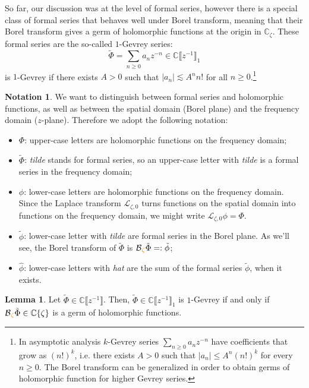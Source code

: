 \documentclass{article}
\theoremstyle{definition}
\newcommand{\C}{\mathbb{C}}
\newcommand{\laplace}{\mathcal{L}}
\newcommand{\borel}{\mathcal{B}}
\newtheorem{lemma}[definition]{Lemma}
\newtheorem*{notation*}{Notation}
\begin{document}
So far, our discussion was at the level of formal series, however there is a special class of formal series that behaves well under Borel transform, meaning that their Borel transform gives a germ of holomorphic functions at the origin in $\C_{\zeta}$. These formal series are the so-called $1$-Gevrey series:
\[\tilde{\Phi}=\sum_{n\geq 0}a_nz^{-n}\in\C \llbracket z^{-1} \rrbracket_1\]
is $1$-Gevrey if there exists $A>0$ such that $|a_n|\lesssim A^n n!$ for all $n\geq 0$.\footnote{In asymptotic analysis $k$-Gevrey series $\sum_{n\geq 0}a_nz^{-n}$ have coefficients that grow as $(n!)^{k}$, i.e. there exists $A>0$ such that $|a_n|\leq A^n (n!)^k$ for every $n\geq 0$. The Borel transform can be generalized in order to obtain germs of holomorphic function for higher Gevrey series. }  

\begin{notation*}
We want to distinguish between formal series and holomorphic functions, as well as between the spatial domain (Borel plane) and the frequency domain ($z$-plane). Therefore we adopt the following notation:
\begin{itemize}
\item $\Phi$: upper-case letters are holomorphic functions on the frequency domain;
\item $\tilde{\Phi}$: \textit{tilde} stands for formal series, so an upper-case letter with \textit{tilde} is a formal series in the frequency domain;
\item $\phi$: lower-case letters are holomorphic functions on the frequency domain. Since the Laplace transform $\laplace_{\zeta, 0}$ turns functions on the spatial domain into functions on the frequency domain, we might write $\laplace_{\zeta,0}\phi=\Phi$.
\item $\tilde{\phi}$: lower-case letter with \textit{tilde} are formal series in the Borel plane. As we’ll see, the Borel transform of $\tilde{\Phi}$ is $\borel\textcolor{orange}{_\zeta} \tilde{\Phi}=:\tilde{\phi}$; 
\item $\hat{\phi}$: lower-case letters with \textit{hat} are the sum of the formal series $\tilde{\phi}$, when it exists.  
\end{itemize}
\end{notation*}  

\begin{lemma}
Let $\tilde{\Phi}\in\C \llbracket z^{-1} \rrbracket$. Then, $\tilde{\Phi}\in\C \llbracket z^{-1} \rrbracket_1$ is $1$-Gevrey if and only if $\borel\textcolor{orange}{_\zeta}\tilde{\Phi}\in\C\lbrace\zeta\rbrace$ is a germ of holomorphic functions. 
\end{lemma}
\end{document}
